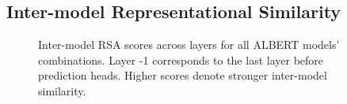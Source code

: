 \documentclass[a4paper, nobind]{templates/ociamthesis}
\begin{document}
\hypertarget{subsubchap:ex2-inter}{%
\subsection{Inter-model Representational Similarity}\label{subsubchap:ex2-inter}}





\begin{figure}

{\centering {}\newline{}

}

\caption{Inter-model RSA scores across layers for all ALBERT models' combinations. Layer -1 corresponds to the last layer before prediction heads. Higher scores denote stronger inter-model similarity.}\label{fig:rsa-inter}
\end{figure}
\end{document}
